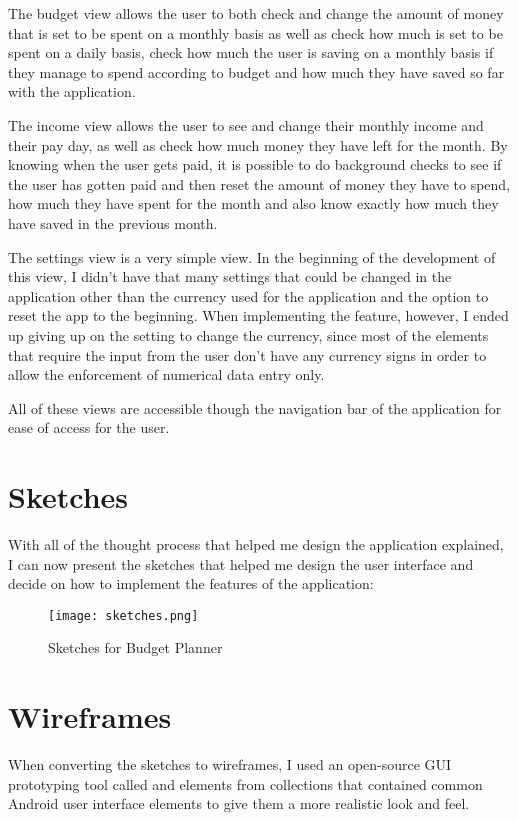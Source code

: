 The budget view allows the user to both check and change the amount of money that is set to be spent on a monthly basis as well as check how much is set to be spent on a daily basis, check how much the user is saving on a monthly basis if they manage to spend according to budget and how much they have saved so far with the application.

The income view allows the user to see and change their monthly income and their pay day, as well as check how much money they have left for the month. By knowing when the user gets paid, it is possible to do background checks to see if the user has gotten paid and then reset the amount of money they have to spend, how much they have spent for the month and also know exactly how much they have saved in the previous month.

The settings view is a very simple view. In the beginning of the development of this view, I didn't have that many settings that could be changed in the application other than the currency used for the application and the option to reset the app to the beginning. When implementing the feature, however, I ended up giving up on the setting to change the currency, since most of the elements that require the input from the user don't have any currency signs in order to allow the enforcement of numerical data entry only.

All of these views are accessible though the navigation bar of the application for ease of access for the user.

\section{Sketches}
With all of the thought process that helped me design the application explained, I can now present the sketches that helped me design the user interface and decide on how to implement the features of the application:

\begin{figure}
  \caption{Sketches for Budget Planner}
  \centering
  \texttt{[image: sketches.png]}
\end{figure}

\section{Wireframes}
When converting the sketches to wireframes, I used an open-source GUI prototyping tool called \cite{pencil} and elements from collections that contained common Android user interface elements to give them a more realistic look and feel.

